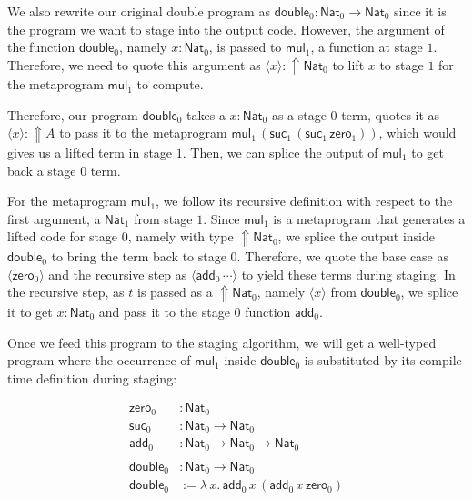 We also rewrite our original double program as $\mathsf{double}_0:\mathsf{Nat}_0\to\mathsf{Nat}_0$ since it is the program we want to stage into the output code. However, the argument of the function $\mathsf{double}_0$, namely $x:\mathsf{Nat}_0$, is passed to $\mathsf{mul}_1$, a function at stage $1$. Therefore, we need to quote this argument as $\langle x\rangle:{\Uparrow}\mathsf{Nat}_0$ to lift $x$ to stage $1$ for the metaprogram $\mathsf{mul}_1$ to compute.


Therefore, our program $\mathsf{double}_0$ takes a $x:\mathsf{Nat}_0$ as a stage $0$ term, quotes it as $\langle x\rangle:{\Uparrow}A$ to pass it to the metaprogram $\mathsf{mul}_1\,(\mathsf{suc}_1\,(\mathsf{suc}_1\,\mathsf{zero}_1))$, which would gives us a lifted term in stage $1$. Then, we can splice the output of $\mathsf{mul}_1$ to get back a stage $0$ term. 

For the metaprogram $\mathsf{mul}_1$, we follow its recursive definition with respect to the first argument, a $\mathsf{Nat}_1$ from stage $1$. Since $\mathsf{mul}_1$ is a metaprogram that generates a lifted code for stage $0$, namely with type ${\Uparrow}\mathsf{Nat}_0$, we splice the output inside $\mathsf{double}_0$ to bring the term back to stage $0$. Therefore, we quote the base case as $\langle \mathsf{zero}_0\rangle$ and the recursive step as $\langle \mathsf{add}_0\,\cdots\rangle$ to yield these terms during staging. In the recursive step, as $t$ is passed as a ${\Uparrow}\mathsf{Nat}_0$, namely $\langle x\rangle$ from $\mathsf{double}_0$, we splice it to get $x:\mathsf{Nat}_0$ and pass it to the stage $0$ function $\mathsf{add}_0$.

Once we feed this program to the staging algorithm, we will get a well-typed program where the occurrence of $\mathsf{mul}_1$ inside $\mathsf{double}_0$ is substituted by its compile time definition during staging:

$$
\begin{aligned}
    \mathsf{zero}_0&:\mathsf{Nat}_0\\
    \mathsf{suc}_0&:\mathsf{Nat}_0\to\mathsf{Nat}_0\\
    \mathsf{add}_0&:\mathsf{Nat}_0\to\mathsf{Nat}_0\to\mathsf{Nat}_0\\
    \\
    \mathsf{double}_0&:\mathsf{Nat}_0\to\mathsf{Nat}_0\\
    \mathsf{double}_0&:=\lambda\,x.\,\mathsf{add}_0\,x\,(\mathsf{add}_0\,x\,\mathsf{zero}_0)\\
\end{aligned}
$$


